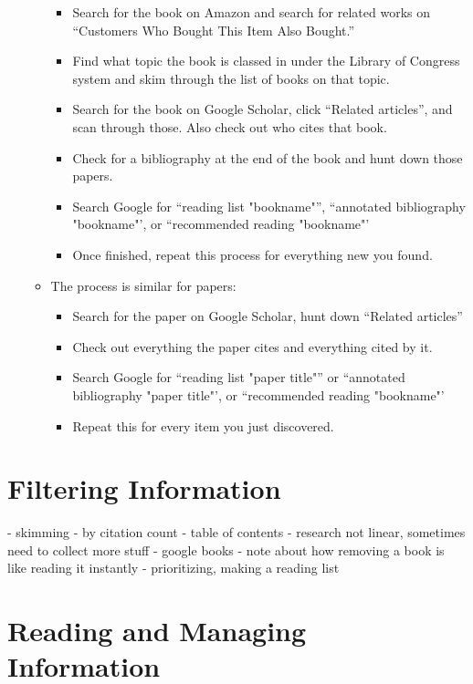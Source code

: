 \begin{enumerate}
\begin{itemize}
\begin{itemize}
    \item Search for the book on Amazon and search for related works on
      ``Customers Who Bought This Item Also Bought.''
    \item Find what topic the book is classed in under the Library of Congress
      system and skim through the list of books on that topic.
    \item Search for the book on Google Scholar, click ``Related articles'', and
      scan through those. Also check out who cites that book.
    \item Check for a bibliography at the end of the book and hunt down those
      papers.
    \item Search Google for ``reading list "bookname"'', ``annotated
      bibliography "bookname"', or ``recommended reading "bookname"'
    \item Once finished, repeat this process for everything new you found.
    \end{itemize}
  \item The process is similar for papers:
    \begin{itemize}
    \item Search for the paper on Google Scholar, hunt down ``Related articles''
    \item Check out everything the paper cites and everything cited by it.
    \item Search Google for ``reading list "paper title"'' or ``annotated
      bibliography "paper title"', or ``recommended reading "bookname"'
    \item Repeat this for every item you just discovered.
    \end{itemize}
  \end{itemize}
\end{enumerate}

\section{Filtering Information}

- skimming
- by citation count
- table of contents
- research not linear, sometimes need to collect more stuff
- google books
- note about how removing a book is like reading it instantly
- prioritizing, making a reading list

\section{Reading and Managing Information}

